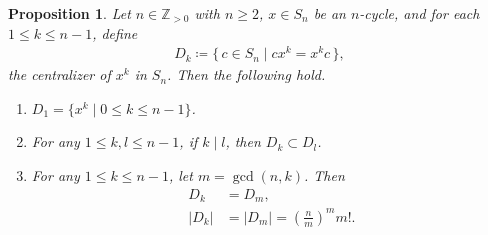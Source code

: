 \documentclass[12pt,reqno]{amsart}
\newcommand{\Zp}{\mathbb{Z}_{> 0}}						%
\newcommand{\f}[2]{\frac{#1}{#2}}							%
\newcommand{\ceq}{\coloneqq} 							%
\theoremstyle{mythmstyle}
\newtheorem{prop}[lemma]{Proposition}
\theoremstyle{mydefstyle}
\numberwithin{equation}{section}
\begin{document}
\begin{prop}
\label{prop:Dk}
Let $n \in \Zp$ with $n \ge 2$, $x \in S_{n}$ be an $n$-cycle, and for each $1 \le k \le n-1$, define
\begin{align}
\label{eq:defDk}
D_k \ceq \{\,c\in S_n \mid cx^k=x^k c\,\},
\end{align}
the centralizer of $x^k$ in $S_n$.
Then the following hold.
\begin{enumerate}
\item \label{itm:xcom1}
$D_1=\{x^k \mid 0\le k\le n-1\}$.
\item \label{itm:xcom2}
For any $1\le k,l\le n-1$, if $k\mid l$, then $D_k\subset D_l$.
\item \label{itm:xcom3}
For any $1\le k\le n-1$, let $m=\gcd(n,k)$. Then
\begin{align}
D_k&=D_m, \\
\lvert D_k\rvert&=\lvert D_m\rvert=\left(\f{n}{m}\right)^m m!.
\end{align}
\end{enumerate}
\end{prop}
\end{document}
